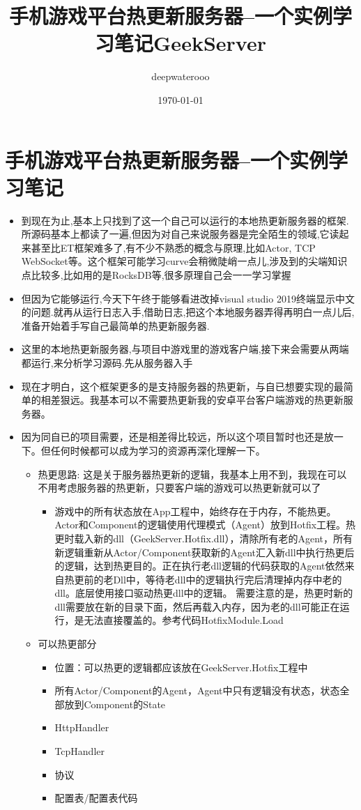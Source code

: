 \documentclass[9pt, b5paper]{article}
\author{deepwaterooo}
\date{\today}
\title{手机游戏平台热更新服务器--一个实例学习笔记GeekServer}
\begin{document}
\maketitle
\tableofcontents


\section{手机游戏平台热更新服务器--一个实例学习笔记}
\label{sec:org258c433}
\begin{itemize}
\item 到现在为止,基本上只找到了这一个自己可以运行的本地热更新服务器的框架.所源码基本上都读了一遍,但因为对自己来说服务器是完全陌生的领域,它读起来甚至比ET框架难多了,有不少不熟悉的概念与原理,比如Actor, TCP WebSocket等。这个框架可能学习curve会稍微陡峭一点儿,涉及到的尖端知识点比较多,比如用的是RocksDB等,很多原理自己会一一学习掌握
\item 但因为它能够运行,今天下午终于能够看进改掉visual studio 2019终端显示中文的问题.就再从运行日志入手,借助日志,把这个本地服务器弄得再明白一点儿后,准备开始着手写自己最简单的热更新服务器.
\item 这里的本地热更新服务器,与项目中游戏里的游戏客户端,接下来会需要从两端都运行,来分析学习源码.先从服务器入手
\item 现在才明白，这个框架更多的是支持服务器的热更新，与自已想要实现的最简单的相差狠远。我基本可以不需要热更新我的安卓平台客户端游戏的热更新服务器。

\item 因为同自已的项目需要，还是相差得比较远，所以这个项目暂时也还是放一下。但任何时候都可以成为学习的资源再深化理解一下。
\begin{itemize}
\item 热更思路: 这是关于服务器热更新的逻辑，我基本上用不到，我现在可以不用考虑服务器的热更新，只要客户端的游戏可以热更新就可以了
\begin{itemize}
\item 游戏中的所有状态放在App工程中，始终存在于内存，不能热更。Actor和Component的逻辑使用代理模式（Agent）放到Hotfix工程。热更时载入新的dll（GeekServer.Hotfix.dll），清除所有老的Agent，所有新逻辑重新从Actor/Component获取新的Agent汇入新dll中执行热更后的逻辑，达到热更目的。正在执行老dll逻辑的代码获取的Agent依然来自热更前的老Dll中，等待老dll中的逻辑执行完后清理掉内存中老的dll。底层使用接口驱动热更dll中的逻辑。 需要注意的是，热更时新的dll需要放在新的目录下面，然后再载入内存，因为老的dll可能正在运行，是无法直接覆盖的。参考代码HotfixModule.Load
\end{itemize}
\item 可以热更部分
\begin{itemize}
\item 位置：可以热更的逻辑都应该放在GeekServer.Hotfix工程中
\item 所有Actor/Component的Agent，Agent中只有逻辑没有状态，状态全部放到Component的State
\item HttpHandler
\item TcpHandler
\item 协议
\item 配置表/配置表代码
\end{itemize}


\end{itemize}
\end{itemize}
\end{document}
